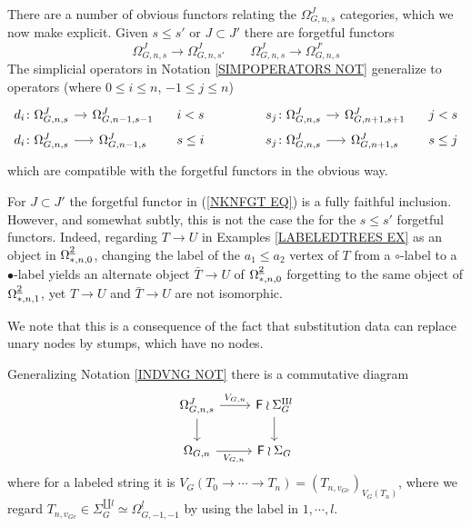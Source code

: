 \documentclass[a4paper,10pt]{article}%
\begin{document}
There are a number of obvious functors relating the $\Omega_{G,n,s}^{J}$ categories, which we now make explicit.
Given $s\leq s'$ or $J \subset J'$ there are forgetful functors
\begin{equation}\label{NKNFGT EQ}
	\Omega_{G,n,s}^{J} \to \Omega_{G,n,s'}^{J}
\qquad
	\Omega_{G,n,s}^{J} \to \Omega_{G,n,s}^{J'}
\end{equation}
The simplicial operators in Notation \ref{SIMPOPERATORS NOT}
generalize to operators (where $0 \leq i \leq n$, $-1\leq j \leq n$)
\[
\begin{tikzcd}[row sep =0,column sep =1em]
	d_i \colon 
	\Omega_{G,n,s}^{J} \ar{r} &
	\Omega_{G,n-1,s-1}^{J} &
	i < s & & & &
	s_j \colon 
	\Omega_{G,n,s}^{J} \ar{r} &
	\Omega_{G,n+1,s+1}^{J} &
	j < s
\\
	d_i \colon 
	\Omega_{G,n,s}^{J} \ar{r} &
	\Omega_{G,n-1,s}^{J} &
	s \leq i & & & &
	s_j \colon 
	\Omega_{G,n,s}^{J} \ar{r} &
	\Omega_{G,n+1,s}^{J} &
	s \leq j
\end{tikzcd}
\]
which are compatible with the forgetful functors in the obvious way.


\begin{remark}
	For $J \subset J'$ the forgetful functor in (\ref{NKNFGT EQ}) is a fully faithful inclusion. 
	However, and somewhat subtly, this is not the case the for the $ s \leq s'$ forgetful functors. Indeed, regarding
	$T \to U$ in Examples \ref{LABELEDTREES EX} as an object in 
	$\Omega_{\**,n,0}^{\underline{2}}$, changing the label of the $a_1 \leq a_2$ vertex of $T$ from a $\circ$-label to a $\bullet$-label yields an alternate object $\bar{T} \to U$
	of $\Omega_{\**,n,0}^{\underline{2}}$ forgetting to the same object of $\Omega_{\**,n,1}^{\underline{2}}$, yet $T \to U$ and $\bar{T} \to U$ are not isomorphic.
	
	We note that this is a consequence of the fact that substitution data can replace unary nodes by stumps, which have no nodes.
\end{remark}

Generalizing Notation \ref{INDVNG NOT} there is a commutative diagram 
\[
\begin{tikzcd}
	\Omega_{G,n,s}^{J} \ar{r}{V_{G,n}} \ar{d}& 
	\Fin \wr \Sigma_G^{\amalg l} \ar{d}
\\
	\Omega_{G,n} \ar{r}[swap]{V_{G,n}} &
	\Fin \wr \Sigma_G
\end{tikzcd}
\]
where for a labeled string it is 
$V_G(T_0 \to \cdots \to T_n) =
(T_{n,v_{Ge}})_{V_G(T_n)}$, where we regard 
$T_{n,v_{Ge}} \in \Sigma_G^{\amalg l} \simeq \Omega_{G,-1,-1}^{\underline{l}}$ by using the label in $1,\cdots, l$.
\end{document}
